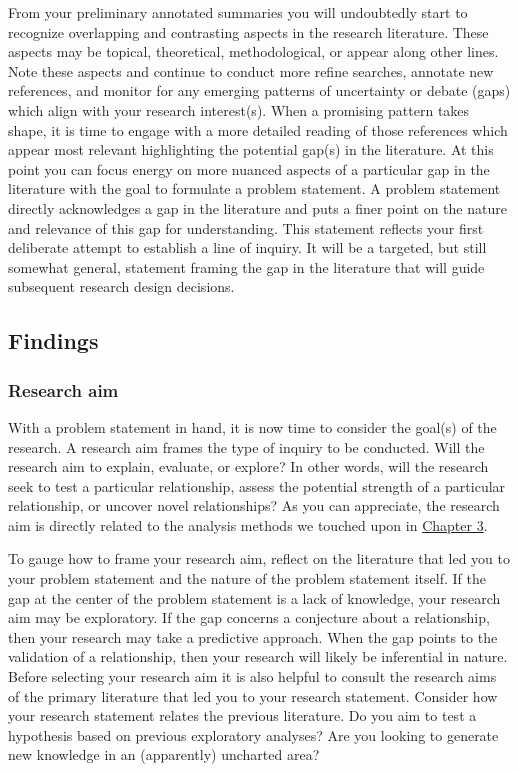 \documentclass[
]{article}
\begin{document}
From your preliminary annotated summaries you will undoubtedly start to recognize overlapping and contrasting aspects in the research literature. These aspects may be topical, theoretical, methodological, or appear along other lines. Note these aspects and continue to conduct more refine searches, annotate new references, and monitor for any emerging patterns of uncertainty or debate (gaps) which align with your research interest(s). When a promising pattern takes shape, it is time to engage with a more detailed reading of those references which appear most relevant highlighting the potential gap(s) in the literature. At this point you can focus energy on more nuanced aspects of a particular gap in the literature with the goal to formulate a problem statement. A problem statement directly acknowledges a gap in the literature and puts a finer point on the nature and relevance of this gap for understanding. This statement reflects your first deliberate attempt to establish a line of inquiry. It will be a targeted, but still somewhat general, statement framing the gap in the literature that will guide subsequent research design decisions.

\hypertarget{findings}{%
\subsection{Findings}\label{findings}}

\hypertarget{research-aim}{%
\subsubsection{Research aim}\label{research-aim}}

With a problem statement in hand, it is now time to consider the goal(s) of the research. A research aim frames the type of inquiry to be conducted. Will the research aim to explain, evaluate, or explore? In other words, will the research seek to test a particular relationship, assess the potential strength of a particular relationship, or uncover novel relationships? As you can appreciate, the research aim is directly related to the analysis methods we touched upon in \protect\hyperlink{approaching-analysis}{Chapter 3}.

To gauge how to frame your research aim, reflect on the literature that led you to your problem statement and the nature of the problem statement itself. If the gap at the center of the problem statement is a lack of knowledge, your research aim may be exploratory. If the gap concerns a conjecture about a relationship, then your research may take a predictive approach. When the gap points to the validation of a relationship, then your research will likely be inferential in nature. Before selecting your research aim it is also helpful to consult the research aims of the primary literature that led you to your research statement. Consider how your research statement relates the previous literature. Do you aim to test a hypothesis based on previous exploratory analyses? Are you looking to generate new knowledge in an (apparently) uncharted area?
\end{document}
